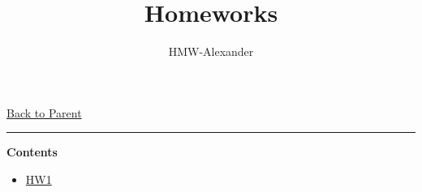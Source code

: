 \documentclass[letterpaper,11pt]{article}
\title{\textbf{Homeworks}}
\author{HMW-Alexander}
\newcommand{\panhline}{\begin{center}\rule{\textwidth}{1pt}\end{center}}
\begin{document}
\maketitle
\href{../index.html}{Back to Parent}

\panhline
\textbf{Contents}

\begin{itemize}
	\item \href{./HW1/document.html}{HW1}
\end{itemize}
\end{document}
